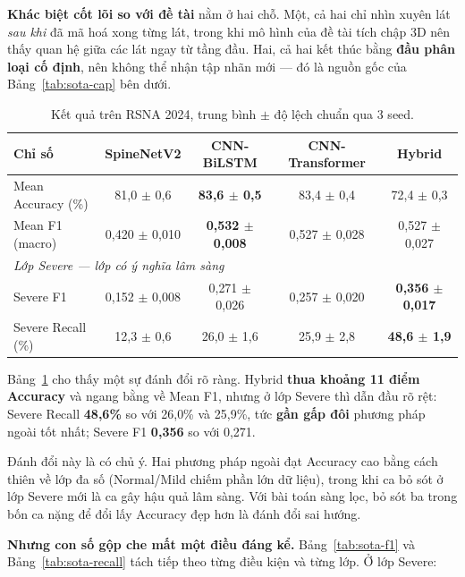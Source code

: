 \documentclass[11pt,a4paper]{article}
\newcommand{\up}[1]{\textcolor{teal!70!black}{\textbf{#1}}}
\newcommand{\down}[1]{\textcolor{red!65!black}{#1}}
\begin{document}
\textbf{Khác biệt cốt lõi so với đề tài} nằm ở hai chỗ. Một, cả hai chỉ nhìn xuyên lát \emph{sau
khi} đã mã hoá xong từng lát, trong khi mô hình của đề tài tích chập 3D nên thấy quan hệ giữa các
lát ngay từ tầng đầu. Hai, cả hai kết thúc bằng \textbf{đầu phân loại cố định}, nên không thể nhận
tập nhãn mới --- đó là nguồn gốc của Bảng~\ref{tab:sota-cap} bên dưới.

\begin{table}[htbp]
\centering\small
\caption{Kết quả trên RSNA 2024, trung bình $\pm$ độ lệch chuẩn qua 3 seed.}
\label{tab:sota}
\begin{tabular}{lcccc}
\toprule
\textbf{Chỉ số} & \textbf{SpineNetV2} & \textbf{CNN-BiLSTM} & \textbf{CNN-Transformer} & \textbf{Hybrid} \\
\midrule
Mean Accuracy (\%) & 81{,}0 $\pm$ 0{,}6 & \textbf{83{,}6 $\pm$ 0{,}5} & 83{,}4 $\pm$ 0{,}4 & \down{72{,}4 $\pm$ 0{,}3} \\
Mean F1 (macro)    & 0{,}420 $\pm$ 0{,}010 & \textbf{0{,}532 $\pm$ 0{,}008} & 0{,}527 $\pm$ 0{,}028 & 0{,}527 $\pm$ 0{,}027 \\
\midrule
\multicolumn{5}{l}{\textit{Lớp Severe --- lớp có ý nghĩa lâm sàng}} \\
Severe F1        & 0{,}152 $\pm$ 0{,}008 & 0{,}271 $\pm$ 0{,}026 & 0{,}257 $\pm$ 0{,}020 & \up{\textbf{0{,}356 $\pm$ 0{,}017}} \\
Severe Recall (\%) & 12{,}3 $\pm$ 0{,}6 & 26{,}0 $\pm$ 1{,}6 & 25{,}9 $\pm$ 2{,}8 & \up{\textbf{48{,}6 $\pm$ 1{,}9}} \\
\bottomrule
\end{tabular}
\end{table}

Bảng~\ref{tab:sota} cho thấy một sự đánh đổi rõ ràng. Hybrid \textbf{thua khoảng 11 điểm
Accuracy} và ngang bằng về Mean F1, nhưng ở lớp Severe thì dẫn đầu rõ rệt: Severe Recall
\textbf{48{,}6\%} so với 26{,}0\% và 25{,}9\%, tức \textbf{gần gấp đôi} phương pháp ngoài tốt nhất;
Severe F1 \textbf{0{,}356} so với 0{,}271.

Đánh đổi này là có chủ ý. Hai phương pháp ngoài đạt Accuracy cao bằng cách thiên về lớp đa số
(Normal/Mild chiếm phần lớn dữ liệu), trong khi ca bỏ sót ở lớp Severe mới là ca gây hậu quả lâm
sàng. Với bài toán sàng lọc, bỏ sót ba trong bốn ca nặng để đổi lấy Accuracy đẹp hơn là đánh đổi
sai hướng.

\textbf{Nhưng con số gộp che mất một điều đáng kể.} Bảng~\ref{tab:sota-f1} và
Bảng~\ref{tab:sota-recall} tách tiếp theo từng điều kiện và từng lớp. Ở lớp Severe:
\end{document}
